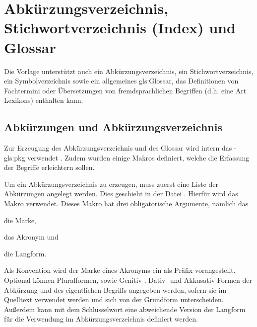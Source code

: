 \section{Abkürzungsverzeichnis, Stichwortverzeichnis (Index) und Glossar}%
\label{sec:Glossare}
%
Die Vorlage unterstützt auch ein Abkürzungsverzeichnis, ein Stichwortverzeichnis,
ein Symbolverzeichnis sowie ein allgemeines \gls{gls:Glossar},
das Definitionen von Fachtermini oder
Übersetzungen von fremdsprachlichen Begriffen
(d.h. eine Art Lexikons) enthalten kann.


\subsection{Abkürzungen und Abkürzungsverzeichnis}%
\label{sec:Akronyme}
Zur Erzeugung des Abkürzungsverzeichnis und des Glossar wird intern das
-\gls{gls:pkg} verwendet \cite{talbot2014}.
Zudem wurden einige Makros definiert, welche die Erfassung der Begriffe erleichtern sollen.

Um ein Abkürzungsverzeichnis zu erzeugen, muss zuerst eine Liste der Abkürzungen angelegt werden.
Dies geschieht in der Datei .
Hierfür wird das Makro  verwendet.
Dieses Makro hat drei obligatorische Argumente, nämlich das
\begin{itemize*}
\item die Marke,
\item das Akronym und
\item die Langform.
\end{itemize*}
Als Konvention wird der Marke eines Akronyms ein  als Präfix vorangestellt.
Optional können Pluralformen, sowie Genitiv-, Dativ- und Akkusativ-Formen 
der Abkürzung und des eigentlichen Begriffs angegeben werden,
sofern sie im Quelltext verwendet werden und sich von der Grundform unterscheiden.
Außerdem kann mit dem Schlüsselwort 
eine abweichende Version der Langform für die Verwendung im Abkürzungsverzeichnis definiert werden.

